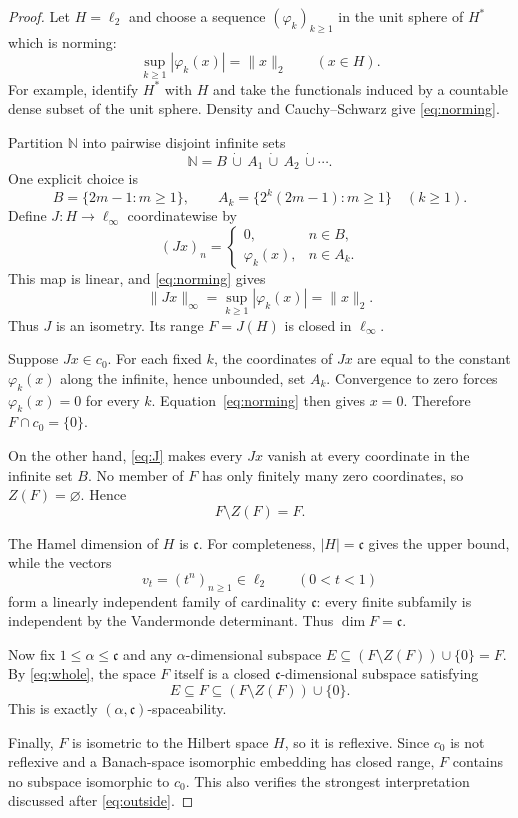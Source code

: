 \documentclass[11pt]{article}
\newcommand{\N}{\mathbb N}
\newcommand{\cC}{\mathfrak c}
\begin{document}
\begin{proof}
Let $H=\ell_2$ and choose a sequence $(\varphi_k)_{k\ge1}$ in the unit sphere
of $H^*$ which is norming:
\begin{equation}\label{eq:norming}
 \sup_{k\ge1}|\varphi_k(x)|=\|x\|_2\qquad(x\in H).
\end{equation}
For example, identify $H^*$ with $H$ and take the functionals induced by a
countable dense subset of the unit sphere.  Density and Cauchy--Schwarz give
\eqref{eq:norming}.

Partition $\N$ into pairwise disjoint infinite sets
\[
 \N=B\,\dot\cup\,A_1\,\dot\cup\,A_2\,\dot\cup\cdots.
\]
One explicit choice is
\[
 B=\{2m-1:m\ge1\},\qquad
 A_k=\{2^k(2m-1):m\ge1\}\quad(k\ge1).
\]
Define $J:H\to\ell_\infty$ coordinatewise by
\begin{equation}\label{eq:J}
 (Jx)_n=
 \begin{cases}
  0,&n\in B,\\
  \varphi_k(x),&n\in A_k.
 \end{cases}
\end{equation}
This map is linear, and \eqref{eq:norming} gives
\[
 \|Jx\|_\infty=\sup_{k\ge1}|\varphi_k(x)|=\|x\|_2.
\]
Thus $J$ is an isometry.  Its range $F=J(H)$ is closed in $\ell_\infty$.

Suppose $Jx\in c_0$.  For each fixed $k$, the coordinates of $Jx$ are equal
to the constant $\varphi_k(x)$ along the infinite, hence unbounded, set
$A_k$.  Convergence to zero forces $\varphi_k(x)=0$ for every $k$.
Equation~\eqref{eq:norming} then gives $x=0$.  Therefore
$F\cap c_0=\{0\}$.

On the other hand, \eqref{eq:J} makes every $Jx$ vanish at every coordinate
in the infinite set $B$.  No member of $F$ has only finitely many zero
coordinates, so $Z(F)=\varnothing$.  Hence
\begin{equation}\label{eq:whole}
 F\setminus Z(F)=F.
\end{equation}

The Hamel dimension of $H$ is $\cC$.  For completeness, $|H|=\cC$ gives the
upper bound, while the vectors
\[
 v_t=(t^n)_{n\ge1}\in\ell_2\qquad(0<t<1)
\]
form a linearly independent family of cardinality $\cC$: every finite
subfamily is independent by the Vandermonde determinant.  Thus
$\dim F=\cC$.

Now fix $1\le\alpha\le\cC$ and any $\alpha$-dimensional subspace
$E\subseteq(F\setminus Z(F))\cup\{0\}=F$.  By \eqref{eq:whole}, the space
$F$ itself is a closed $\cC$-dimensional subspace satisfying
\[
 E\subseteq F\subseteq(F\setminus Z(F))\cup\{0\}.
\]
This is exactly $(\alpha,\cC)$-spaceability.

Finally, $F$ is isometric to the Hilbert space $H$, so it is reflexive.
Since $c_0$ is not reflexive and a Banach-space isomorphic embedding has
closed range, $F$ contains no subspace isomorphic to $c_0$.  This also verifies
the strongest interpretation discussed after \eqref{eq:outside}.
\end{proof}
\end{document}
